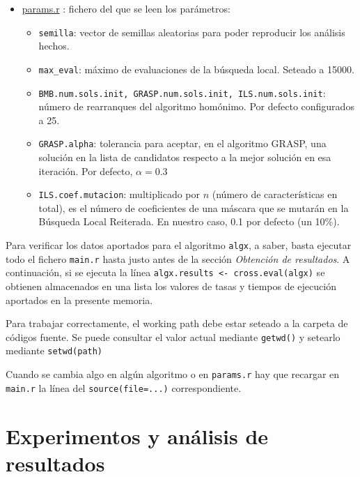 \documentclass[a4paper,11pt]{article}
\newcommand{\hrefr}[1]{
\href{../bin/#1}{#1}
}
\begin{document}
\begin{itemize}
 \item \hrefr{params.r}: fichero del que se leen los parámetros:
  \begin{itemize}
    \item \texttt{semilla}: vector de semillas aleatorias para poder reproducir los análisis hechos.
    \item \texttt{max\_eval}: máximo de evaluaciones de la búsqueda local. Seteado a 15000.
    \item \texttt{BMB.num.sols.init, GRASP.num.sols.init, ILS.num.sols.init}: número de rearranques del algoritmo homónimo.
    Por defecto configurados a 25.
    \item \texttt{GRASP.alpha}: tolerancia para aceptar, en el algoritmo GRASP, una solución en la lista de candidatos 
    respecto a la mejor solución en esa iteración. Por defecto, $\alpha=0.3$
    \item \texttt{ILS.coef.mutacion}: multiplicado por $n$ (número de características en total), es el número de coeficientes
    de una máscara que se mutarán en la Búsqueda Local Reiterada. En nuestro caso, 0.1 por defecto (un 10\%).
  \end{itemize}
 \end{itemize}
 
 Para verificar los datos aportados para el algoritmo \texttt{algx}, a saber, basta ejecutar todo el fichero \texttt{main.r}
 hasta justo antes de la sección \textit{Obtención de resultados}. A continuación, si se ejecuta la línea 
 \texttt{algx.results <- cross.eval(algx)} se obtienen almacenados en una lista los valores de tasas y tiempos de ejecución
 aportados en la presente memoria. 
 
 Para trabajar correctamente, el working path debe estar seteado a la carpeta de códigos fuente. Se puede consultar el 
 valor actual mediante \texttt{getwd()} y setearlo mediante \texttt{setwd(path)}
 
 Cuando se cambia algo en algún algoritmo o en \texttt{params.r} hay que recargar en \texttt{main.r}
 la línea del \texttt{source(file=...)} correspondiente.
 
 \section{Experimentos y análisis de resultados}
\end{document}
